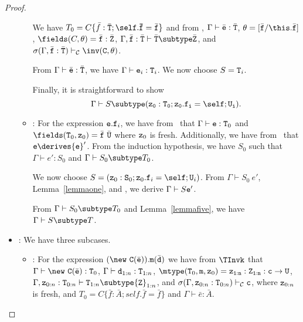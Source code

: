 \begin{proof}
\begin{itemize}
\begin{itemize}
             We have 
             $T_0 = C\{\bar{f}: \bar{\tt T}{\tt ;\self.\bar{f}}=\bar{\tt f}\}$
             and from \TNew, 
             $\Gamma \vdash \bar{\tt e}: \bar{\tt T}$,
             $\theta=[\bar{\tt f}/\this.\bar{\tt f}]$,
             $\fields(C,\theta)=\bar{\tt f}: \bar{\tt Z}$,
             $\Gamma, \bar{\tt f}: \bar{\tt T} \vdash 
                   \bar{\tt T} \subtype \bar{\tt Z}$, and
             $\sigma(\Gamma, \bar{\tt f}: \bar{\tt T}) \vdash_{\cal C} 
                   \inv({\tt C},\theta)$.

             From $\Gamma \vdash \bar{\tt e}: \bar{\tt T}$, we have
             $\Gamma \vdash {\tt e}_i: {\tt T}_i$.
             We now choose $S = {\tt T}_i$.

             Finally, it is straightforward to show
             $$\Gamma \vdash S \subtype \tt (z_0: T_0; z_0.f_i = \self; U_i).$$
   \item
   \RCField: For the expression ${\tt e.f}_i$, we have from \TField\ that
             $\Gamma \vdash {\tt e}: {\tt T}_0$ and
             $\fields({\tt T}_0,{\tt z}_0)= \bar{\tt f}\ \bar{\tt U}$
             where ${\tt z}_0$ is fresh.
             Additionally, we have from \RCField\ that  
             ${\tt e} \derives {{\tt e}}'$.
             From the induction hypothesis, we have $S_0$ such that 
             $\Gamma \vdash e': S_0$ and $\Gamma \vdash S_0 \subtype T_0$.

             We now choose 
             $S = 
               ({\tt z}_0: {\tt S}_0; {\tt z}_0.{\tt f}_i=\self;{\tt U}_i)$.
             From $\Gamma \vdash S_0\ e'$, Lemma~\ref{lemmaone}, and
             \TField, we derive
             $\Gamma \vdash S {{\tt e}}'$.

             From $\Gamma \vdash S_0 \subtype T_0$ and 
             Lemma~\ref{lemmafive}, we have $\Gamma \vdash S \subtype T$.
   \end{itemize}
\item
\TInvk: We have three subcases.
   \begin{itemize}
   \item
   \RInvk:  For the expression 
            $(\new\ {\tt C}(\bar{\tt e})).{\tt m}(\bar{\tt d})$
            we have from $\TInvk$ that
            $\Gamma \vdash \new\ {\tt C}(\bar{\tt e}): {\tt T}_0$,
            $\Gamma \vdash {\tt d}_{1:n}: {\tt T}_{1:n}$,
            $\mtype({\tt T}_0,{\tt m},{\tt z}_0) = 
               \tt {\tt z}_{1:n}: {\tt Z}_{1:n}:c \rightarrow {\tt U}$,
            $\Gamma, {\tt z}_{0:n}: {\tt T}_{0:n} \vdash 
                  {\tt T}_{1:n} \subtype {\tt Z}_{1:n}$, and
            $\sigma(\Gamma, {\tt z}_{0:n}: {\tt T}_{0:n}) \vdash_{\cal C}                          {\tt c}$, 
            where ${\tt z}_{0:n}$ is fresh, and
            $T_0 = C\{\bar{f}: \bar{A}; self.\bar{f} = \bar{f}\}$ and
            $\Gamma \vdash \bar{e}: \bar{A}$.


\end{itemize}
\end{itemize}
\end{proof}
